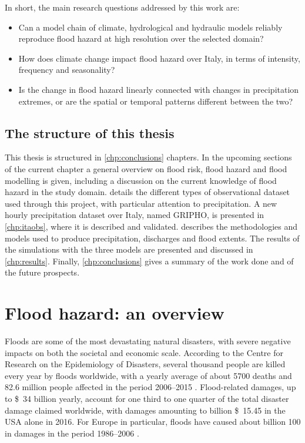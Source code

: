In short, the main research questions addressed by this work are:
\begin{itemize}
    \item Can a model chain of climate, hydrological and hydraulic models reliably reproduce flood hazard at high resolution over the selected domain?
    \item How does climate change impact flood hazard over Italy, in terms of intensity, frequency and seasonality?
    \item Is the change in flood hazard linearly connected with changes in precipitation extremes, or are the spatial or temporal patterns different between the two?
\end{itemize}

\subsection{The structure of this thesis}
This thesis is structured in \ref{chp:conclusions} chapters.
In the upcoming sections of the current chapter a general overview on flood risk, flood hazard and flood modelling is given, including a discussion on the current knowledge of flood hazard in the study domain.
 details the different types of observational dataset used through this project, with particular attention to precipitation.
A new hourly precipitation dataset over Italy, named GRIPHO, is presented in \cref{chp:itaobs}, where it is described and validated.
 describes the methodologies and models used to produce precipitation, discharges and flood extents.
The results of the simulations with the three models are presented and discussed in \cref{chp:results}.
Finally, \cref{chp:conclusions} gives a summary of the work done and of the future prospects.

\section{Flood hazard: an overview} \label{sec:flood_overview}
Floods are some of the most devastating natural disasters, with severe negative impacts on both the societal and economic scale. According to the Centre for Research on the Epidemiology of Disasters, several thousand people are killed every year by floods worldwide, with a yearly average of about 5700 deaths and 82.6 million people affected in the period 2006--2015 \citep{Guha-sapir2011}. Flood-related damages, up to \SI{34}[\$]{\nothing} billion  yearly, account for one third \citep{MunichRE} to one quarter \citep{Guha-sapir2011} of the total disaster damage claimed worldwide, with damages amounting to billion \SI{15.45}[\$]{\nothing} in the USA alone in 2016. For Europe in particular, floods have caused about billion \SI{100}[\officialeuro]{\nothing} in damages in the period 1986--2006 \citep{Cea2007}.

